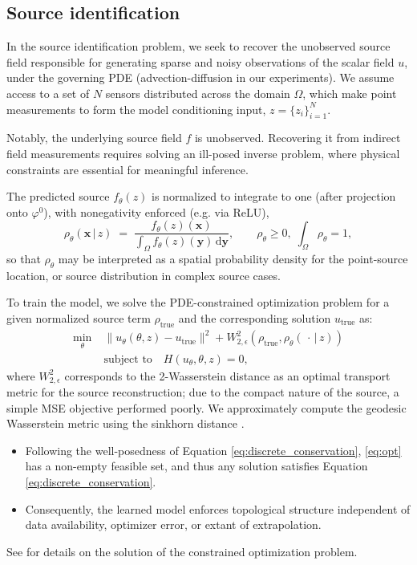 \documentclass[onefignum,onetabnum]{siamart171218} %
\begin{document}
\subsection{Source identification}
\label{sec:methodology_si}


In the source identification problem, we seek to recover the unobserved source field responsible for generating sparse and noisy observations of the scalar field \( u \), under the governing PDE (advection-diffusion in our experiments). We assume access to a set of \( N \) sensors distributed across the domain \( \Omega \), which make point measurements to form the model conditioning input, \( z = \{ z_i \}_{i=1}^N \). 

Notably, the underlying source field \( f \) is unobserved. Recovering it from indirect field measurements requires solving an ill-posed inverse problem, where physical constraints are essential for meaningful inference.

The predicted source $f_\theta(z)$ is normalized to integrate to one (after projection onto \(\varphi^0\)), with nonegativity enforced (e.g. via ReLU),
\begin{equation}
    \label{eq:density}
    \rho_\theta(\mathbf{x}\,|\,z)
    \;=\;
    \frac{f_\theta(z)(\mathbf{x})}
         {\displaystyle\int_{\Omega}f_\theta(z)(\mathbf{y})\,\mathrm{d}\mathbf{y}},
    \qquad
    \rho_\theta\ge 0,
    \;
    \int_{\Omega}\rho_\theta=1,
\end{equation}
so that $\rho_\theta$ may be interpreted as a spatial probability density for the point-source location, or source distribution in complex source cases. %

To train the model, we solve the PDE-constrained optimization problem for a given normalized source term \(\rho_{\mathrm{true}}\) and the corresponding solution \(u_{\mathrm{true}}\) as:
\begin{align}\label{eq:opt}
    \min_{\theta} \; &\| u_\theta(\theta, z) - u_{\text{true}} \|^2 + W_{2,\epsilon}^2(\rho_{\mathrm{true}},\rho_\theta(\,\cdot\,|\,z))
    \\
    &\text{subject to} \quad H(u_\theta, \theta, z) = 0,
\end{align}
where $W_{2,\epsilon}^2$ corresponds to the 2-Wasserstein distance as an optimal transport metric for the source reconstruction; due to the compact nature of the source, a simple MSE objective performed poorly.
We approximately compute the geodesic Wasserstein metric using the sinkhorn distance \cite{cuturi2013sinkhorn}.
\begin{itemize}[leftmargin=*]
    \item Following the well-posedness of Equation \ref{eq:discrete_conservation}, \ref{eq:opt} has a non-empty feasible set, and thus any solution satisfies Equation \ref{eq:discrete_conservation}.
    \item Consequently, the learned model enforces topological structure independent of data availability, optimizer error, or extant of extrapolation.
\end{itemize}
See \cite{kinch2025structure} for details on the solution of the constrained optimization problem.
\end{document}
